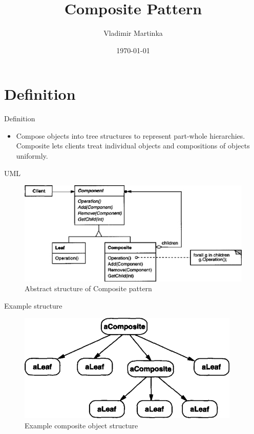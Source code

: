\documentclass{beamer}
\title{Composite Pattern}
\author{Vladimir Martinka}
\institute{IBM}
\date{\today}
\begin{document}
\frame{\titlepage}

\section{Definition}
\begin{frame}{Definition}
	\begin{itemize}
	    \item Compose objects into tree structures to represent part-whole hierarchies. Composite lets clients treat individual objects and compositions of objects uniformly. \cite{gofComposite}
	\end{itemize}
\end{frame}

\begin{frame}{UML}
    \begin{figure}[h]
        \caption{Abstract structure of Composite pattern \cite{gofComposite}}
        \centering
        \includegraphics[width=\textwidth]{compositeUml}
    \end{figure}
\end{frame}

\begin{frame}{Example structure}
    \begin{figure}[h]
        \caption{Example composite object structure \cite{gofComposite}}
        \centering
        \includegraphics[width=\textwidth]{compositeExample}
    \end{figure}
\end{frame}
\end{document}
